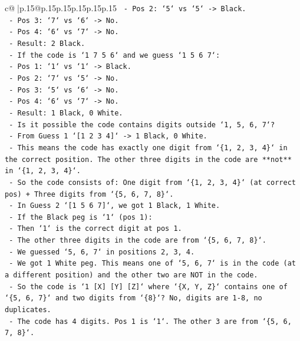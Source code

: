 \documentclass{article}
\begin{document}
{\begin{supertabular}{c@{$\;$}|p{.15\linewidth}@{}p{.15\linewidth}p{.15\linewidth}p{.15\linewidth}p{.15\linewidth}p{.15\linewidth}}
{{{\texttt{        {-}   Pos 2: `5` vs `5` {-}> Black.} \\
\texttt{        {-}   Pos 3: `7` vs `6` {-}> No.} \\
\texttt{        {-}   Pos 4: `6` vs `7` {-}> No.} \\
\texttt{        {-}   Result: 2 Black.} \\
\texttt{    {-}   If the code is `1 7 5 6` and we guess `1 5 6 7`:} \\
\texttt{        {-}   Pos 1: `1` vs `1` {-}> Black.} \\
\texttt{        {-}   Pos 2: `7` vs `5` {-}> No.} \\
\texttt{        {-}   Pos 3: `5` vs `6` {-}> No.} \\
\texttt{        {-}   Pos 4: `6` vs `7` {-}> No.} \\
\texttt{        {-}   Result: 1 Black, 0 White.} \\
\texttt{    {-}   Is it possible the code contains digits outside `1, 5, 6, 7`?} \\
\texttt{        {-}   From Guess 1 `{[}1 2 3 4{]}` {-}> 1 Black, 0 White.} \\
\texttt{        {-}   This means the code has exactly one digit from `\{1, 2, 3, 4\}` in the correct position. The other three digits in the code are **not** in `\{1, 2, 3, 4\}`.} \\
\texttt{        {-}   So the code consists of: One digit from `\{1, 2, 3, 4\}` (at correct pos) + Three digits from `\{5, 6, 7, 8\}`.} \\
\texttt{        {-}   In Guess 2 `{[}1 5 6 7{]}`, we got 1 Black, 1 White.} \\
\texttt{        {-}   If the Black peg is `1` (pos 1):} \\
\texttt{            {-}   Then `1` is the correct digit at pos 1.} \\
\texttt{            {-}   The other three digits in the code are from `\{5, 6, 7, 8\}`.} \\
\texttt{            {-}   We guessed `5, 6, 7` in positions 2, 3, 4.} \\
\texttt{            {-}   We got 1 White peg. This means one of `5, 6, 7` is in the code (at a different position) and the other two are NOT in the code.} \\
\texttt{            {-}   So the code is `1 {[}X{]} {[}Y{]} {[}Z{]}` where `\{X, Y, Z\}` contains one of `\{5, 6, 7\}` and two digits from `\{8\}`? No, digits are 1{-}8, no duplicates.} \\
\texttt{            {-}   The code has 4 digits. Pos 1 is `1`. The other 3 are from `\{5, 6, 7, 8\}`.} \\
}}}
\end{supertabular}}
\end{document}
